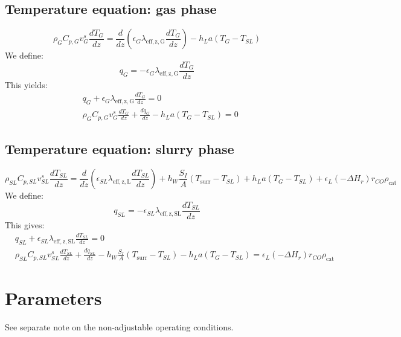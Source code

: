 \documentclass{article}
\begin{document}
\subsection{Temperature equation: gas phase}
\begin{equation}
	\rho_G C_{p,G} v_G^s\frac{dT_G}{dz} = \frac{d}{dz}\left(\epsilon_G \lambda_{\mathrm{eff,z,G}}\frac{dT_G}{dz} \right) - h_L a (T_G - T_{SL})
\end{equation}
We define:
\begin{equation}
	q_G = - \epsilon_G \lambda_{\mathrm{eff,z,G}}\frac{dT_G}{dz} 
\end{equation}
This yields:
\begin{equation}
	\begin{split}
		&q_G + \epsilon_G \lambda_{\mathrm{eff,z,G}}\frac{dT_G}{dz} = 0 \\
		&\rho_G C_{p,G} v_G^s\frac{dT_G}{dz} + \frac{dq_G}{dz}- h_L a (T_G - T_{SL}) = 0
	\end{split}
\end{equation}

\subsection{Temperature equation: slurry phase}
\begin{equation}
	\rho_{SL} C_{p,SL} v_{SL}^s\frac{d T_{SL}}{dz} = \frac{d}{dz}\left(\epsilon_{SL}\lambda_{\mathrm{eff,z,L}}\frac{d T_{SL}}{dz}\right) + h_W\frac{S_I}{A}(T_{\mathrm{surr}}-T_{SL}) + h_L a (T_G - T_{SL}) + \epsilon_{L}(-\Delta H_r)r_{CO}\rho_{\mathrm{cat}}
\end{equation}
We define:
\begin{equation}
	q_{SL} = - \epsilon_{SL} \lambda_{\mathrm{eff,z,SL}}\frac{dT_{SL}}{dz}
\end{equation}
This gives:
\begin{equation}
	\begin{split}
	&q_{SL} + \epsilon_{SL} \lambda_{\mathrm{eff,z,SL}}\frac{dT_{SL}}{dz} = 0\\
	&\rho_{SL} C_{p,SL} v_{SL}^s\frac{d T_{SL}}{dz} + \frac{d q_{SL}}{dz} - h_W\frac{S_I}{A}(T_{\mathrm{surr}}-T_{SL}) - h_L a (T_G - T_{SL}) = \epsilon_{L}(-\Delta H_r)r_{CO}\rho_{\mathrm{cat}}
	\end{split}
\end{equation}

\section{Parameters}
See separate note on the non-adjustable operating conditions.
\end{document}
